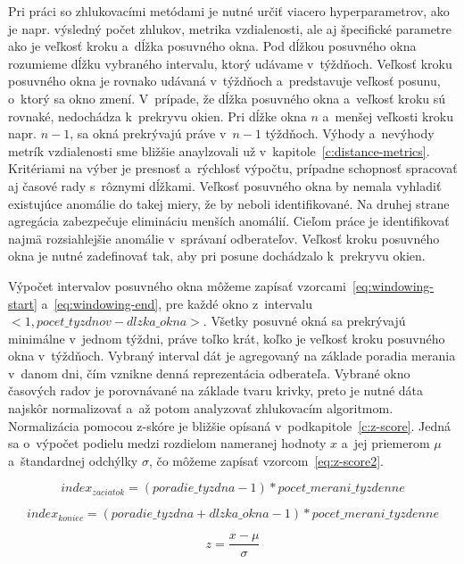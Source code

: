 \documentclass[a4paper,twoside,slovak,12pt,appendix]{article}
\begin{document}
\noindent
Pri práci so zhlukovacími metódami je nutné určiť viacero hyperparametrov, ako
je napr. výsledný počet zhlukov, metrika vzdialenosti, ale aj špecifické
parametre ako je veľkosť kroku a~dĺžka posuvného okna. Pod dĺžkou posuvného okna
rozumieme dĺžku vybraného intervalu, ktorý udávame v~týždňoch. Veľkosť kroku
posuvného okna je rovnako udávaná v~týždňoch a~predstavuje veľkosť posunu,
o~ktorý sa okno zmení. V~prípade, že dĺžka posuvného okna a~veľkosť kroku sú
rovnaké, nedochádza k~prekryvu okien. Pri dĺžke okna $n$ a~menšej veľkosti kroku
napr. $n-1$, sa okná prekrývajú práve v~$n-1$ týždňoch. Výhody a~nevýhody metrík
vzdialenosti sme bližšie anaylzovali už v~kapitole~\ref{c:distance-metrics}.
Kritériami na výber je presnosť a~rýchlosť výpočtu, prípadne schopnosť spracovať
aj časové rady s~rôznymi dĺžkami. Veľkosť posuvného okna by nemala vyhladiť
existujúce anomálie do takej miery, že by neboli identifikované. Na druhej
strane agregácia zabezpečuje elimináciu menších anomálií. Cieľom práce je
identifikovať najmä rozsiahlejšie anomálie v~správaní odberateľov. Veľkosť kroku
posuvného okna je nutné zadefinovať tak, aby pri posune dochádzalo k~prekryvu
okien.

Výpočet intervalov posuvného okna môžeme zapísať
vzorcami~\ref{eq:windowing-start} a~\ref{eq:windowing-end}, pre každé okno
z~intervalu $<1, pocet\_tyzdnov - dlzka\_okna>$. Všetky posuvné okná sa
prekrývajú minimálne v~jednom týždni, práve toľko krát, koľko je veľkosť kroku
posuvného okna v~týždňoch. Vybraný interval dát je agregovaný na základe
poradia merania v~danom dni, čím vznikne denná reprezentácia odberateľa. Vybrané
okno časových radov je porovnávané na základe tvaru krivky, preto je nutné dáta
najskôr normalizovať a~až potom analyzovať zhlukovacím algoritmom. Normalizácia
pomocou z-skóre  je bližšie opísaná v~podkapitole~\ref{c:z-score}. Jedná sa
o~výpočet podielu medzi rozdielom nameranej hodnoty $x$ a~jej priemerom $\mu$
a~štandardnej odchýlky $\sigma$, čo môžeme zapísať vzorcom~\ref{eq:z-score2}.

\begin{equation}
  index_{zaciatok} = (poradie\_tyzdna - 1) * pocet\_merani\_tyzdenne
  \label{eq:windowing-start}
\end{equation}

\begin{equation}
  index_{koniec} = (poradie\_tyzdna + dlzka\_okna - 1) * pocet\_merani\_tyzdenne
  \label{eq:windowing-end}
\end{equation}

\begin{equation}
	\label{eq:z-score2}
  z = \frac{x-\mu}{\sigma}
\end{equation}
\end{document}

